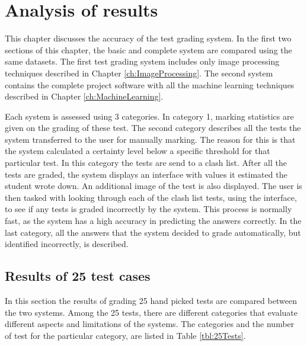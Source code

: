 \chapter{Analysis of results}
\label{ch:Results}
\ifpdf
\graphicspath{{Chapter5/Chapter5Figures/}}
\fi

This chapter discusses the accuracy of the test grading system. In the first two sections of this chapter, the basic and complete system are compared using the same datasets. The first test grading system includes only image processing techniques described in Chapter \ref{ch:ImageProcessing}. The second system contains the complete project software with all the machine learning techniques described in Chapter \ref{ch:MachineLearning}.

Each system is assessed using 3 categories. In category 1, marking statistics are given on the grading of these test. The second category describes all the tests the system transferred to the user for manually marking. The reason for this is that the system calculated a certainty level below a specific threshold for that particular test. In this category the tests are send to a clash list. After all the tests are graded, the system displays an interface with values it estimated the student wrote down. An additional image of the test is also displayed. The user is then tasked with looking through each of the clash list tests, using the interface, to see if any tests is graded incorrectly by the system. This process is normally fast, as the system has a high accuracy in predicting the answers correctly. In the last category, all the answers that the system decided to grade automatically, but identified incorrectly, is described.

\section{Results of 25 test cases}

In this section the results of grading 25 hand picked tests are compared between the two systems. Among the 25 tests, there are different categories that evaluate different aspects and limitations of the systems. The categories and the number of test for the particular category, are listed in Table \ref{tbl:25Tests}.

